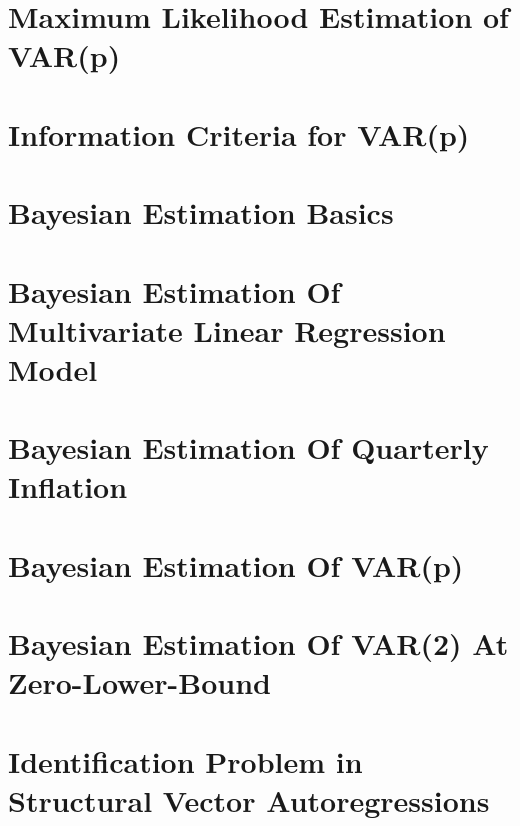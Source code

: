 \documentclass[a4paper]{scrartcl}
\begin{document}
    \section{Maximum Likelihood Estimation of VAR(p)}
    
    
    \section{Information Criteria for VAR(p)}
    
    
    \section{Bayesian Estimation Basics}
    
    
    \section{Bayesian Estimation Of Multivariate Linear Regression Model}
    
    
    \section{Bayesian Estimation Of Quarterly Inflation}
    
    
    \section{Bayesian Estimation Of VAR(p)}
    
    
    \section{Bayesian Estimation Of VAR(2) At Zero-Lower-Bound}
    
    
    \section{Identification Problem in Structural Vector Autoregressions}
    
    
\end{document}
